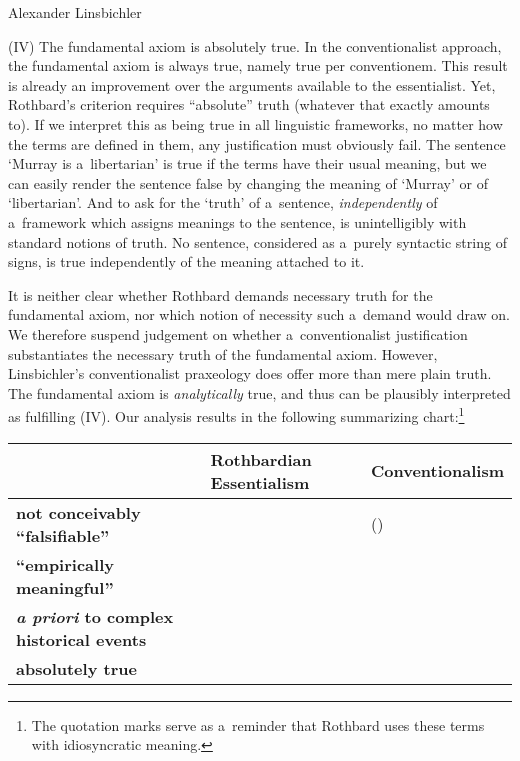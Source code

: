 \begin{artengenv}{Alexander Linsbichler}
\medskip

\noindent (IV) The fundamental axiom is absolutely true. In the conventionalist approach, the fundamental axiom is always true, namely true per conventionem. This result is already an improvement over the arguments available to the essentialist. Yet, Rothbard's criterion requires ``absolute'' truth (whatever that exactly amounts to). If we interpret this as being true in all linguistic frameworks, no matter how the terms are defined in them, any justification must obviously fail. The sentence ‘Murray is a~libertarian' is true if the terms have their usual meaning, but we can easily render the sentence false by changing the meaning of ‘Murray' or of ‘libertarian'. And to ask for the ‘truth' of a~sentence, \textit{independently} of a~framework which assigns meanings to the sentence, is unintelligibly with standard notions of truth. No sentence, considered as a~purely syntactic string of signs, is true independently of the meaning attached to it.



It is neither clear whether Rothbard demands necessary truth for the fundamental axiom, nor which notion of necessity such a~demand would draw on. We therefore suspend judgement on whether a~conventionalist justification substantiates the necessary truth of the fundamental axiom. However, Linsbichler's conventionalist praxeology does offer more than mere plain truth. The fundamental axiom is \textit{analytically} true, and thus can be plausibly interpreted as fulfilling (IV). Our analysis results in the following summarizing chart:\footnote{The quotation marks serve as a~reminder that Rothbard uses these terms with idiosyncratic meaning.}







\begin{table}[H]
    \centering
    \begin{adjustbox}{max width=\textwidth}
        \begin{tabularx}{\textwidth}{|L{4.5cm}|Y|Y|}
            \hline
            & \textbf{Rothbardian Essentialism} & \textbf{Conven\-tion\-alism} \\ \hline
            \textbf{not conceivably ``falsifiable''} &  & () \\ \hline
            \textbf{``empirically meaningful''} &  &  \\ \hline
            \textbf{\textit{a priori} to complex historical events} &  &  \\ \hline
            \textbf{absolutely true} &  &  \\ \hline
        \end{tabularx}
    \end{adjustbox}
\end{table}


\end{artengenv}
